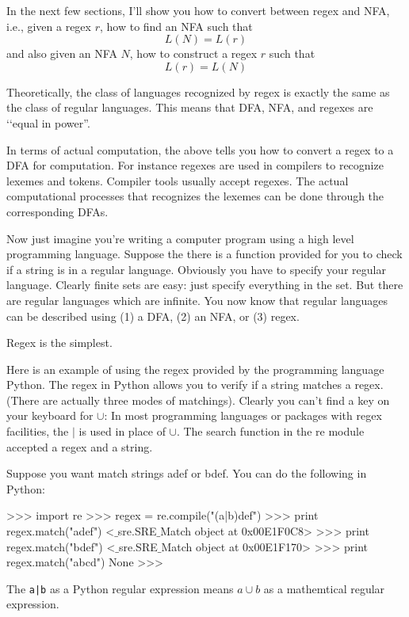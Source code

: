 In the next few sections, I'll show you how to convert between
regex and NFA, i.e., given a regex $r$, how to find an NFA
such that 
\[
L(N) = L(r)
\]
and also given an NFA $N$, how to construct a regex $r$ such that
\[
L(r) = L(N)
\]

Theoretically, the class of languages recognized by regex is
exactly the same as the class of regular languages. 
This means that DFA, NFA, and regexes are \lq\lq equal in power''.

In terms of actual computation, 
the above tells you how to convert a regex to a DFA for computation.
For instance regexes are used in compilers to recognize
lexemes and tokens.
Compiler tools usually accept regexes.
The actual computational processes
that recognizes the lexemes
can be done through the corresponding 
DFAs.

Now just imagine you're writing a computer program using a high
level programming language. Suppose the there is a function
provided for you to check if a string is in a regular language.
Obviously you have to specify your regular language. Clearly
finite sets are easy: just specify everything in the set. But
there are regular languages which are infinite. You now know that
regular languages can be described using (1) a DFA, (2) an NFA, or
(3) regex.

Regex is the simplest.

Here is an example of using the regex provided by the programming
language Python. The regex in Python allows you to verify if a
string matches a regex. (There are actually three modes of
matchings). Clearly you can't find a key on your keyboard for
$\cup$: In most programming languages or packages with regex
facilities, the $|$ is used in place of $\cup$. The search
function in the re module accepted a regex and a string.

\begin{eg} Suppose you want match strings adef or bdef. You can do
the following in Python:
\begin{console}
>>> import re
>>> regex = re.compile("(a|b)def")
>>> print regex.match("adef")
<$\_$sre.SRE$\_$Match object at 0x00E1F0C8>
>>> print regex.match("bdef")
<$\_$sre.SRE$\_$Match object at 0x00E1F170>
>>> print regex.match("abcd")
None
>>>
\end{console}
The \texttt{a|b} as a Python regular expression
means $a \cup b$ as a mathemtical regular expression.
\end{eg}

